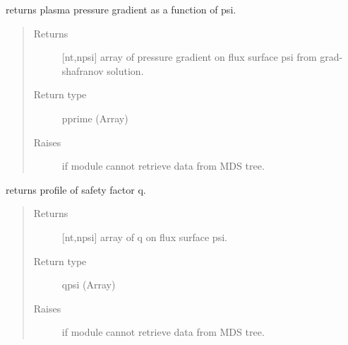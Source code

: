 \documentclass[letterpaper,10pt,english]{sphinxmanual}
\begin{document}
\begin{fulllineitems}
\begin{fulllineitems}
\begin{quote}
\begin{description}
\end{description}\end{quote}

\end{fulllineitems}


\begin{fulllineitems}
\label{\detokenize{eqtools:eqtools.CModEFIT.CModEFITTree.getPPrime}}
returns plasma pressure gradient as a function of psi.
\begin{quote}\begin{description}
\item[{Returns}] \leavevmode
{[}nt,npsi{]} array of pressure gradient on flux surface
psi from grad-shafranov solution.

\item[{Return type}] \leavevmode
pprime (Array)

\item[{Raises}] \leavevmode
{} \textendash{} if module cannot retrieve data from MDS tree.

\end{description}\end{quote}

\end{fulllineitems}


\begin{fulllineitems}
\label{\detokenize{eqtools:eqtools.CModEFIT.CModEFITTree.getQProfile}}
returns profile of safety factor q.
\begin{quote}\begin{description}
\item[{Returns}] \leavevmode
{[}nt,npsi{]} array of q on flux surface psi.

\item[{Return type}] \leavevmode
qpsi (Array)

\item[{Raises}] \leavevmode
{} \textendash{} if module cannot retrieve data from MDS tree.


\end{description}
\end{quote}
\end{fulllineitems}
\end{fulllineitems}
\end{document}
